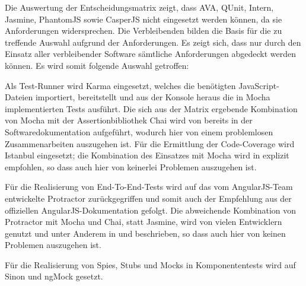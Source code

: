 	Die Auswertung der Entscheidungsmatrix zeigt, dass AVA, QUnit, Intern, Jasmine, PhantomJS sowie CasperJS nicht eingesetzt werden können, da sie Anforderungen widersprechen. Die Verbleibenden bilden die Basis für die zu treffende Auswahl aufgrund der Anforderungen. Es zeigt sich, dass nur durch den Einsatz aller verbleibender Software sämtliche Anforderungen abgedeckt werden können. Es wird somit folgende Auswahl getroffen:
	
	Als Test-Runner wird Karma eingesetzt, welches die benötigten JavaScript-Dateien importiert, bereitstellt und aus der Konsole heraus die in Mocha implementierten Tests ausführt. Die sich aus der Matrix ergebende Kombination von Mocha mit der Assertionbibliothek Chai wird von \textcite{mocha-index} bereits in der Softwaredokumentation aufgeführt, wodurch hier von einem problemlosen Zusammenarbeiten auszugehen ist. Für die Ermittlung der Code-Coverage wird Istanbul eingesetzt; die Kombination des Einsatzes mit Mocha wird in \cite{istanbul} explizit empfohlen, so dass auch hier von keinerlei Problemen auszugehen ist.
	
	Für die Realisierung von End-To-End-Tests wird auf das vom AngularJS-Team entwickelte Protractor zurückgegriffen und somit auch der Empfehlung aus der offiziellen AngularJS-Dokumentation \cite{angular-e2e} gefolgt. Die abweichende Kombination von Protractor mit Mocha und Chai, statt Jasmine, wird von vielen Entwicklern genutzt und unter Anderem in \cite{protractormocha-1} und \cite{protractormocha-2} beschrieben, so dass auch hier von keinen Problemen auszugehen ist.
	
	Für die Realisierung von Spies, Stubs und Mocks in Komponententests wird auf Sinon und ngMock gesetzt.
